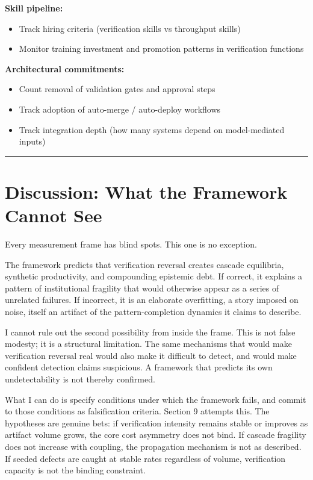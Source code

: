 \documentclass[11pt,a4paper]{article}
\providecommand{\tightlist}{\setlength{\itemsep}{0pt}\setlength{\parskip}{0pt}}
\begin{document}
\textbf{Skill pipeline:}

\begin{itemize}
\tightlist
\item
  Track hiring criteria (verification skills vs throughput skills)
\item
  Monitor training investment and promotion patterns in verification functions
\end{itemize}

\textbf{Architectural commitments:}

\begin{itemize}
\tightlist
\item
  Count removal of validation gates and approval steps
\item
  Track adoption of auto-merge / auto-deploy workflows
\item
  Track integration depth (how many systems depend on model-mediated inputs)
\end{itemize}

\begin{center}\rule{0.5\linewidth}{0.5pt}\end{center}

\hypertarget{discussion-what-the-framework-cannot-see}{%
\section{Discussion: What the Framework Cannot See}\label{discussion-what-the-framework-cannot-see}}

Every measurement frame has blind spots. This one is no exception.

The framework predicts that verification reversal creates cascade equilibria, synthetic productivity, and compounding epistemic debt. If correct, it explains a pattern of institutional fragility that would otherwise appear as a series of unrelated failures. If incorrect, it is an elaborate overfitting, a story imposed on noise, itself an artifact of the pattern-completion dynamics it claims to describe.

I cannot rule out the second possibility from inside the frame. This is not false modesty; it is a structural limitation. The same mechanisms that would make verification reversal real would also make it difficult to detect, and would make confident detection claims suspicious. A framework that predicts its own undetectability is not thereby confirmed.

What I can do is specify conditions under which the framework fails, and commit to those conditions as falsification criteria. Section 9 attempts this. The hypotheses are genuine bets: if verification intensity remains stable or improves as artifact volume grows, the core cost asymmetry does not bind. If cascade fragility does not increase with coupling, the propagation mechanism is not as described. If seeded defects are caught at stable rates regardless of volume, verification capacity is not the binding constraint.
\end{document}
